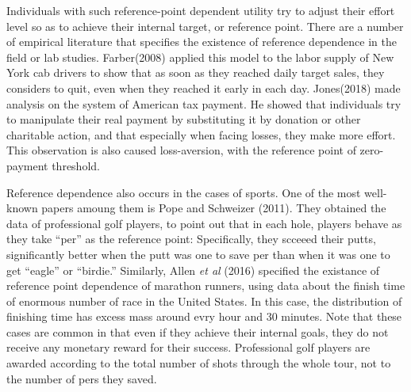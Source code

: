 \documentclass[dvipdfmx, 12pt]{article}
\begin{document}
  \vspace{1zw}

  Individuals with such reference-point dependent utility try to adjust their effort level so as to achieve their internal target, or reference point. There are a number of empirical literature that specifies the existence of reference dependence in the field or lab studies. Farber(2008) applied this model to the labor supply of New York cab drivers to show that as soon as they reached daily target sales, they considers to quit, even when they reached it early in each day. Jones(2018) made analysis on the system of American tax payment. He showed that individuals try to manipulate their real payment by substituting it by donation or other charitable action, and that especially when facing losses, they make more effort. This observation is also caused loss-aversion, with the reference point of zero-payment threshold.

  Reference dependence also occurs in the cases of sports. One of the most well-known papers amoung them is Pope and Schweizer (2011). They obtained the data of professional golf players, to point out that in each hole, players behave as they take ``per'' as the reference point: Specifically, they scceeed their putts, significantly better when the putt was one to save per than when it was one to get ``eagle'' or ``birdie.'' Similarly, Allen \textit{et al} (2016) specified the existance of reference point dependence of marathon runners, using data about the finish time of enormous number of race in the United States. In this case, the distribution of finishing time has excess mass around evry hour and 30 minutes. Note that these cases are common in that even if they achieve their internal goals, they do not receive any monetary reward for their success. Professional golf players are awarded according to the total number of shots through the whole tour, not to the number of pers they saved.
\end{document}
